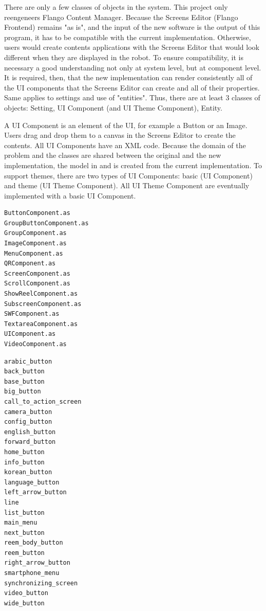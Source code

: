 There are only a few classes of objects in the system.
This project only reengeneers Flango Content Manager.
Because the Screens Editor (Flango Frontend) remains "as is", and the input of the new software is the output of this program, it has to be compatible with the current implementation.
Otherwise, users would create contents applications with the Screens Editor that would look different when they are displayed in the robot.
To ensure compatibility, it is necessary a good understanding not only at system level, but at component level.
It is required, then, that the new implementation can render consistently all of the \ac{UI} components that the Screens Editor can create and all of their properties. 
Same applies to settings and use of "entities".
Thus, there are at least 3 classes of objects: Setting, UI Component (and UI Theme Component), Entity.

A UI Component is an element of the \ac{UI}, for example a Button or an Image.
Users drag and drop them to a canvas in the Screens Editor to create the contents. 
All UI Components have an \ac{XML} code.
Because the domain of the problem and the classes are shared between the original and the new implementation, the model in  and  is created from the current implementation.
To support themes, there are two types of UI Components: basic (UI Component) and theme (UI Theme Component).
All UI Theme Component are eventually implemented with a basic UI Component.

\begin{lstlisting}[caption=Basic UI Components, label=onelabel]
ButtonComponent.as
GroupButtonComponent.as
GroupComponent.as
ImageComponent.as
MenuComponent.as
QRComponent.as
ScreenComponent.as
ScrollComponent.as
ShowReelComponent.as
SubscreenComponent.as
SWFComponent.as
TextareaComponent.as
UIComponent.as
VideoComponent.as
\end{lstlisting}

\begin{lstlisting}[caption=Theme UI Components, label=anotherlabel]
arabic_button
back_button
base_button
big_button
call_to_action_screen
camera_button
config_button
english_button
forward_button
home_button
info_button
korean_button
language_button
left_arrow_button
line
list_button
main_menu
next_button
reem_body_button
reem_button
right_arrow_button
smartphone_menu
synchronizing_screen
video_button
wide_button
\end{lstlisting}

